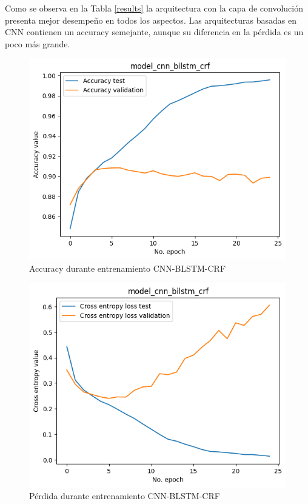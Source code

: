 \documentclass[runningheads]{llncs}
\begin{document}
Como se observa en la Tabla \ref{results} la arquitectura con la capa de convolución
presenta mejor desempeño en todos los aspectos. Las arquitecturas basadas en CNN 
contienen un accuracy semejante, aunque su diferencia en la pérdida es un poco más
grande.

\begin{figure}
	\centering
	\includegraphics[width=12cm]{model_cnn_BiLSTM_crf_acc.png}
	\caption{Accuracy durante entrenamiento CNN-BLSTM-CRF}
	\label{acc_fig}
\end{figure}

\begin{figure}
	\centering
	\includegraphics[width=12cm]{model_cnn_BiLSTM_crf_loss.png}
	\caption{Pérdida durante entrenamiento CNN-BLSTM-CRF}
	\label{loss_fig}
\end{figure}
\end{document}
